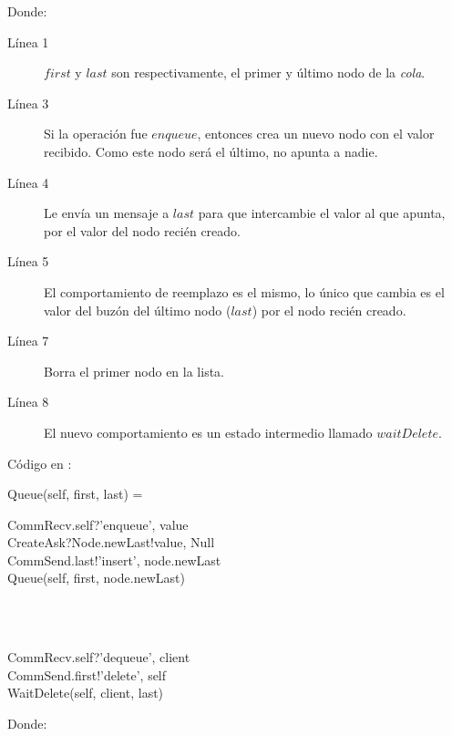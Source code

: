 Donde:

\begin{description}
 \item [Línea 1] $first$ y $last$ son respectivamente, el primer y último nodo de la \textit{cola}.
 \item [Línea 3] Si la operación fue $enqueue$, entonces crea un nuevo nodo con el valor recibido. Como este nodo será el último, no apunta a nadie.
 \item [Línea 4] Le envía un mensaje a $last$ para que intercambie el valor al que apunta, por el valor del nodo recién creado.
 \item [Línea 5] El comportamiento de reemplazo es el mismo, lo único que cambia es el valor del buzón del último nodo ($last$) por el nodo recién creado.
 \item [Línea 7] Borra el primer nodo en la lista.
 \item [Línea 8] El nuevo comportamiento es un estado intermedio llamado $waitDelete$.
\end{description}

Código en \CSP:

\begin{process}
Queue(self, first, last) = \\ \quad
  \begin{block}
  CommRecv.self?\langle 'enqueue', value \rangle \then \\
  CreateAsk?Node.newLast!\langle value, Null \rangle \then \\
  CommSend.last!\langle 'insert', node.newLast \rangle \then \\
  Queue(self, first, node.newLast)
  \end{block} \\

  \Extchoice \\ \quad
  
  \begin{block}
  CommRecv.self?\langle 'dequeue', client \rangle \then \\
  CommSend.first!\langle 'delete', self \rangle \then \\
  WaitDelete(self, client, last)
  \end{block} 
\end{process}

Donde:

